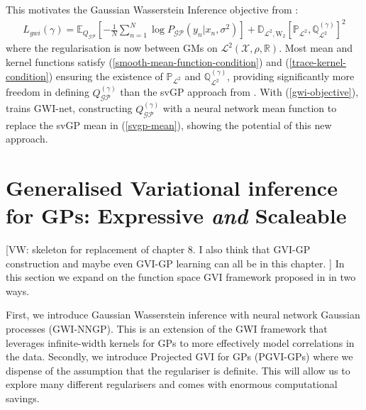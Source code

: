 \documentclass{article}
\newcommand{\vw}[1]{{\color{green} [VW: #1]}}
\newcommand{\GP}{\operatorname{\mathcal{GP}}}
\numberwithin{equation}{section}
\begin{document}
This motivates the Gaussian Wasserstein Inference objective from \cite{wild2022generalized}:
\begin{align}
    \label{gwi-objective}
    L_{gwi}(\gamma) = \mathbb{E}_{Q_{\GP}}\left[- \frac{1}{N}\sum_{n=1}^N \log P_{\GP}\left(y_n \vert x_n, \sigma^2\right) \right] + \mathbb{D}_{\mathcal{L}^2, \text{W}_2} \left[\mathbb{P}_{\mathcal{L}^2}, \mathbb{Q}^{(\gamma)}_{\mathcal{L}^2}\right]^2
\end{align}
where the regularisation is now between GMs on $\mathcal{L}^2(\mathcal{X}, \rho, \mathbb{R})$. Most mean and kernel functions satisfy (\ref{smooth-mean-function-condition}) and (\ref{trace-kernel-condition}) ensuring the existence of $\mathbb{P}_{\mathcal{L}^2}$ and $\mathbb{Q}^{(\gamma)}_{\mathcal{L}^2}$, providing significantly more freedom in defining $Q^{(\gamma)}_{\GP}$ than the svGP approach from \cite{titsias2009variational}. With (\ref{gwi-objective}), \cite{wild2022generalized} trains GWI-net, constructing $Q^{(\gamma)}_{\GP}$ with a neural network mean function to replace the svGP mean in (\ref{svgp-mean}), showing the potential of this new approach.


\newpage

\section{Generalised Variational inference for GPs: Expressive \textit{and} Scaleable}

\vw{skeleton for replacement of chapter 8. I also think that GVI-GP construction and maybe even GVI-GP learning can all be in this chapter. }
In this section we expand on the function space GVI framework proposed in \citet{wild2022generalized} in two ways.

First, we introduce Gaussian Wasserstein inference with neural network Gaussian processes (GWI-NNGP). This is an extension of the GWI framework that leverages infinite-width kernels for GPs to more effectively model correlations in the data. Secondly, we introduce Projected GVI for GPs (PGVI-GPs) where we dispense of the assumption that the regulariser is definite. This will allow us to explore many different regularisers and comes with enormous computational savings.
\end{document}
